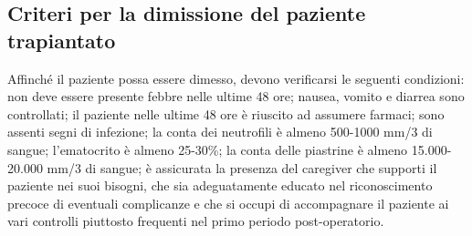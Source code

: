 \subsection{Criteri per la dimissione del paziente trapiantato}

Affinché il paziente possa essere dimesso, devono verificarsi le seguenti condizioni: non deve essere presente febbre 
nelle ultime 48 ore; nausea, vomito e diarrea sono controllati; il paziente nelle ultime 48 ore è riuscito ad assumere 
farmaci; sono assenti segni di infezione; la conta dei neutrofili è almeno 500-1000 mm/3 di sangue; l’ematocrito è 
almeno 25-30\%; la conta delle piastrine è almeno 15.000-20.000 mm/3 di sangue; è assicurata la presenza del 
caregiver che supporti il paziente nei suoi bisogni, che sia adeguatamente educato nel riconoscimento precoce di 
eventuali complicanze e che si occupi di accompagnare il paziente ai vari controlli piuttosto 
frequenti nel primo periodo post-operatorio\cite{STEMCELLS}.\\





















